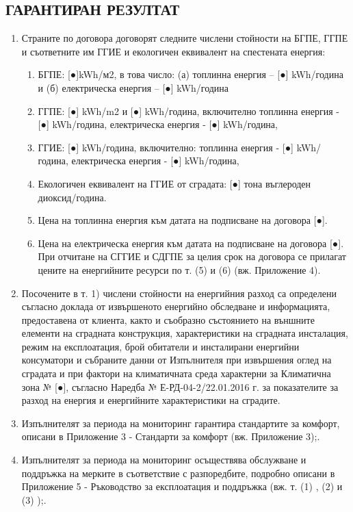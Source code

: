 \subsection{ГАРАНТИРАН РЕЗУЛТАТ}
\begin{enumerate}
\item Страните по договора договорят следните числени стойности на
  БГПЕ, ГГПЕ и съответните им ГГИЕ и екологичен еквивалент на
  спестената енергия:
  \begin{enumerate}
  \item БГПЕ: [●]kWh/м2, в това число: (а) топлинна енергия {–} [●]
    kWh/година и (б) електрическа енергия {–} [●] kWh/година
  \item ГГПЕ: [●] kWh/m2 и [●] kWh/година, включително топлинна
    енергия {-} [●] kWh/година, електрическа енергия {-} [●] kWh/година,
  \item ГГИЕ: [●] kWh/година, включително: топлинна енергия {-} [●]
    kWh/година, електрическа енергия {-} [●] kWh/година,
  \item Екологичен еквивалент на ГГИЕ от сградата: [●] тона въглероден
    диоксид/година.
  \item Цена на топлинна енергия към датата на подписване на договора
    [●].
  \item Цена на електрическа енергия към датата на подписване на
    договора [●].  При отчитане на СГГИЕ и СДГПЕ за целия срок на
    договора се прилагат цените на енергийните ресурси по т. (5) и (6)
    (вж. Приложение 4).
  \end{enumerate}

\item Посочените в т. 1) числени стойности на енергийния разход са
  определени съгласно доклада от извършеното енергийно обследване и
  информацията, предоставена от клиента, както и съобразно състоянието
  на външните елементи на сградната конструкция, характеристики на
  сградната инсталация, режим на експлоатация, брой обитатели и
  инсталирани енергийни консуматори и събраните данни от Изпълнителя
  при извършения оглед на сградата и при фактори на климатичната среда
  характерни за Климатична зона № [●], съгласно Наредба №
  Е{-}РД{-}04{-}2/22.01.2016 г. за показателите за разход на енергия и
  енергийните характеристики на сградите.
\item Изпълнителят за периода на мониторинг гарантира стандартите за
  комфорт, описани в Приложение 3 {-} Стандарти за комфорт (вж. Приложение 3);.
\item Изпълнителят за периода на мониторинг осъществява обслужване и
  поддръжка на мерките в съответствие с разпоредбите, подробно описани
  в Приложение 5 {-} Ръководство за експлоатация и поддръжка
  (вж. т. (1) , (2) и (3) );.
\end{enumerate}

